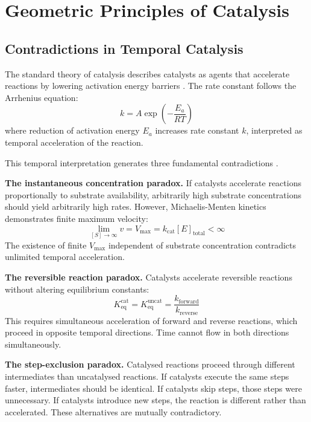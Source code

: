 \documentclass[twocolumn,10pt,a4paper]{article}
\theoremstyle{definition}
\theoremstyle{remark}
\begin{document}
\section{Geometric Principles of Catalysis}
\label{sec:catalysis}

\subsection{Contradictions in Temporal Catalysis}

The standard theory of catalysis describes catalysts as agents that accelerate reactions by lowering activation energy barriers \citep{eyring1935, pauling1946}. The rate constant follows the Arrhenius equation:
\begin{equation}
k = A \exp\left(-\frac{E_a}{RT}\right)
\label{eq:arrhenius}
\end{equation}
where reduction of activation energy $E_a$ increases rate constant $k$, interpreted as temporal acceleration of the reaction.

This temporal interpretation generates three fundamental contradictions \citep{sachikonye2024catalysis}.

\textbf{The instantaneous concentration paradox.} If catalysts accelerate reactions proportionally to substrate availability, arbitrarily high substrate concentrations should yield arbitrarily high rates. However, Michaelis-Menten kinetics demonstrates finite maximum velocity:
\begin{equation}
\lim_{[S] \to \infty} v = V_{\max} = k_{\mathrm{cat}}[E]_{\mathrm{total}} < \infty
\end{equation}
The existence of finite $V_{\max}$ independent of substrate concentration contradicts unlimited temporal acceleration.

\textbf{The reversible reaction paradox.} Catalysts accelerate reversible reactions without altering equilibrium constants:
\begin{equation}
K_{\mathrm{eq}}^{\mathrm{cat}} = K_{\mathrm{eq}}^{\mathrm{uncat}} = \frac{k_{\mathrm{forward}}}{k_{\mathrm{reverse}}}
\end{equation}
This requires simultaneous acceleration of forward and reverse reactions, which proceed in opposite temporal directions. Time cannot flow in both directions simultaneously.

\textbf{The step-exclusion paradox.} Catalysed reactions proceed through different intermediates than uncatalysed reactions. If catalysts execute the same steps faster, intermediates should be identical. If catalysts skip steps, those steps were unnecessary. If catalysts introduce new steps, the reaction is different rather than accelerated. These alternatives are mutually contradictory.
\end{document}
